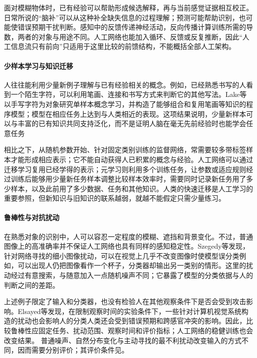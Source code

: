 面对模糊物体时，已有经验可以帮助形成候选解释，再与当前感觉证据相互校正。日常所说的“脑补”可以从这种补全缺失信息的过程理解；预测可能帮助识别，也可能使错误预期干扰判断。感知中的反馈传递神经活动，反向传播计算训练所需的导数，两者的对象与用途不同。人工网络也能加入循环、反馈或反复推断，因此“人工信息流只有前向”只适用于这里比较的前馈结构，不能概括全部人工架构。

\paragraph{少样本学习与知识迁移}
人往往能利用少量新例子理解与已有经验相关的概念。例如，已经熟悉书写的人看到一个陌生字符，可以利用笔画、连接和书写方式来判断它的其他写法。Lake等以手写字符为对象研究单样本概念学习，并构造了能够组合和复用笔画等知识的程序模型；模型在相应任务上达到与人类相近的表现。这项结果说明，少量新样本可以与丰富的已有知识共同支持泛化，而不是证明人脑在毫无先前经验时也能学会任意任务

相比之下，从随机参数开始、针对固定类别训练的监督网络，常需要较多带标签样本才能形成相应表示；它不能自动获得人已积累的概念与经验。人工网络可以通过迁移学习复用已经学得的表示；元学习则利用多个训练任务，让参数或适应规则经过训练后能够用少量新任务样本调整比较样本效率时，需要同时记录新任务用了多少样本，以及此前用了多少数据、任务和其他知识。人类的快速迁移是人工学习的重要参照，但新知识与旧知识的联系越弱，就越不能假定只需少量练习。

\paragraph{鲁棒性与对抗扰动}
在熟悉对象的识别中，人可以容忍一定程度的模糊、遮挡和背景变化。不过，普通图像上的高准确率并不保证人工网络也具有同样的感知稳定性。Szegedy等发现，针对网络寻找的细小图像扰动，可以在视觉上几乎不改变图像时使模型误分类例如，可以出现人仍把图像看作一个杯子，分类器却输出另一类别的情形。这里的扰动经过有意搜索，与随意加入一点随机噪声不同；它暴露了模型的分类依据与人的判断之间的差距。

上述例子限定了输入和分类器，也没有检验人在其他观察条件下是否会受到攻击影响。Elsayed等发现，在限制观察时间的实验条件下，一些针对计算机视觉系统构造的扰动也会影响人的分类人类还会受到错误预期和跨感官冲突的影响。因此，比较鲁棒性应固定任务、扰动范围、观察时间和评价指标；人工网络的稳健训练也会改变结果。
普通噪声、自然分布变化与主动寻找的最不利扰动改变输入的方式不同，因而需要分别评价；其评价条件见。

